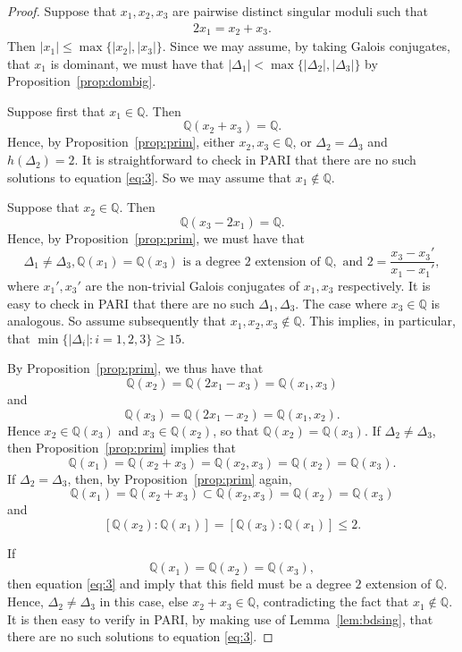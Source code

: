 \documentclass[12pt,a4paper,oneside]{amsart}
\begin{document}
	\begin{proof}
		Suppose that $x_1, x_2, x_3$ are pairwise distinct singular moduli such that
		\begin{align}\label{eq:3} 
		2 x_1 = x_2 + x_3.
		\end{align}
		Then $\lvert x_1 \rvert \leq \max \{\lvert x_2 \rvert, \lvert x_3 \rvert\}$. Since we may assume, by taking Galois conjugates, that $x_1$ is dominant, we must have that $\lvert \Delta_1 \rvert < \max \{\lvert \Delta_2 \rvert, \lvert \Delta_3 \rvert\}$ by Proposition~\ref{prop:dombig}. 
		
		Suppose first that $x_1 \in \mathbb Q$. Then
		\[ \mathbb{Q} (x_2 + x_3) = \mathbb{Q}.\]
		Hence, by Proposition~\ref{prop:prim}, either $x_2, x_3 \in \mathbb Q$, or $\Delta_2 = \Delta_3$ and $h(\Delta_2) = 2$. It is straightforward to check in PARI that there are no such solutions to equation \eqref{eq:3}. So we may assume that $x_1 \notin \mathbb Q$.
		
		Suppose that $x_2 \in \mathbb Q$. Then
		\[ \mathbb Q(x_3 - 2 x_1) = \mathbb Q.\]
		Hence, by Proposition~\ref{prop:prim}, we must have that 
		\[ \Delta_1 \neq \Delta_3, \mathbb Q(x_1) = \mathbb Q(x_3) \mbox{ is a degree $2$ extension of } \mathbb Q, \mbox{ and } 2=\frac{x_3 - x_3'}{x_1 - x_1'},\]
		where $x_1', x_3'$ are the non-trivial Galois conjugates of $x_1, x_3$ respectively. It is easy to check in PARI that there are no such $\Delta_1, \Delta_3$. The case where $x_3 \in \mathbb Q$ is analogous. So assume subsequently that $x_1, x_2, x_3 \notin \mathbb Q$. This implies, in particular, that $\min \{ \lvert \Delta_i \rvert : i=1, 2, 3\} \geq 15$.
		
		By Proposition~\ref{prop:prim}, we thus have that 
		\[\mathbb Q(x_2) = \mathbb Q(2 x_1 - x_3) = \mathbb Q(x_1, x_3)\]
		and 
		\[\mathbb Q(x_3) = \mathbb Q(2 x_1 - x_2) = \mathbb Q(x_1, x_2).\] 
	Hence $x_2 \in \mathbb{Q}(x_3)$ and $x_3 \in \mathbb {Q}(x_2)$, so that $\mathbb{Q}(x_2) = \mathbb{Q}(x_3)$. If $\Delta_2 \neq \Delta_3$, then Proposition~\ref{prop:prim} implies that
	\[ \mathbb Q(x_1) = \mathbb Q(x_2 + x_3) = \mathbb Q(x_2, x_3) = \mathbb{Q}(x_2) = \mathbb{Q}(x_3).\] 
	If $\Delta_2 = \Delta_3$, then, by Proposition~\ref{prop:prim} again,
		\[ \mathbb Q(x_1) = \mathbb Q(x_2 + x_3) \subset \mathbb Q(x_2, x_3) = \mathbb{Q}(x_2) = \mathbb{Q}(x_3)\]
		and 
		\[ \left[\mathbb{Q}\left(x_2\right) : \mathbb{Q}\left(x_1\right)\right] = \left[\mathbb{Q}\left(x_3\right) : \mathbb{Q}\left(x_1\right)\right] \leq 2.\] 
	
		If 
		\[ \mathbb Q (x_1) = \mathbb Q (x_2) = \mathbb Q (x_3),\]
		then equation \eqref{eq:3} and \cite[Th.~1.5]{Fowler24} imply that this field must be a degree $2$ extension of $\mathbb{Q}$. Hence, $\Delta_2 \neq \Delta_3$ in this case, else $x_2 + x_3 \in \mathbb Q$, contradicting the fact that $x_1 \notin \mathbb{Q}$. It is then easy to verify in PARI, by making use of Lemma~\ref{lem:bdsing}, that there are no such solutions to equation \eqref{eq:3}.
		

\end{proof}
\end{document}
